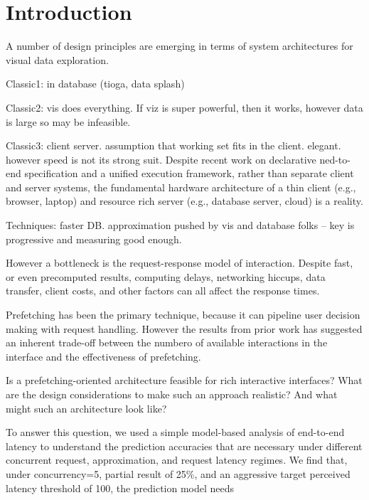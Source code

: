 
\section{Introduction}

\label{s:intro}

A number of design principles are emerging in terms of system architectures
for visual data exploration.

Classic1: in database (tioga, data splash)

Classic2: vis does everything.  If viz is super powerful, then it works, however data is large so may be infeasible.

Classic3: client server.  assumption that working set fits in the client.  elegant.  however speed is not its strong suit.
Despite recent work on declarative ned-to-end specification and a unified execution framework, rather than separate client and server systems, the fundamental hardware architecture of a thin client (e.g., browser, laptop) and resource rich server (e.g., database server, cloud) is a reality.

Techniques: faster DB.  
approximation pushed by vis and database folks -- key is progressive and measuring good enough.

However a bottleneck is the request-response model of interaction.    Despite fast, or even precomputed results, computing delays, networking hiccups, data transfer, client costs, and other factors can all affect the response times.

Prefetching has been the primary technique, because it can pipeline user decision making with request handling.  However the results from prior work has suggested an inherent trade-off between the numbero of available interactions in the interface and the effectiveness of prefetching.

Is a prefetching-oriented architecture feasible for rich interactive interfaces?  What are the design considerations to make such an approach realistic?  And what might such an architecture look like?

To answer this question, we used a simple model-based analysis of end-to-end latency to understand the prediction accuracies that are necessary under different concurrent request, approximation, and request latency regimes.  We find that, under concurrency=5, partial result of 25\%, and an aggressive target perceived latency threshold of 100, the prediction model needs 

